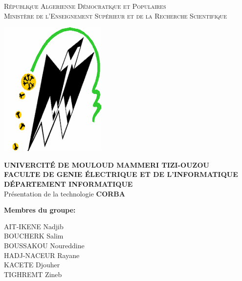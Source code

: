 \begin{center}
    \textsc{\large{République Algerienne Démocratique et Populaires}}\\ \medskip
    \textsc{\large{Ministère de l'Enseignement Supérieur et de la Recherche Scientifique}}\\
\end{center}

\begin{center}
    \includegraphics[scale=0.5]{pdg/ummto.png}\vspace*{0.5cm}
\end{center}

\begin{center}
    \textbf{\small{UNIVERCITÉ DE MOULOUD MAMMERI TIZI-OUZOU}}\\ \smallskip
    \textbf{\small{FACULTE DE GENIE ÉLECTRIQUE ET DE L’INFORMATIQUE}}\\ \smallskip
    \textbf{\small{DÉPARTEMENT INFORMATIQUE}}\\ \vspace*{1cm}
    \LARGE{Présentation de la technologie \textbf{CORBA}}\\
    
\end{center} \vspace*{1cm}

\begin{flushleft}
    \textbf{\large{Membres du groupe}:} \vspace{0.2cm}

        \hspace{0.5cm}AIT-IKENE Nadjib\\
        \hspace{0.5cm}BOUCHERK Salim\\
        \hspace{0.5cm}BOUSSAKOU Noureddine \\
        \hspace{0.5cm}HADJ-NACEUR Rayane \\
        \hspace{0.5cm}KACETE Djouher\\
        \hspace{0.5cm}TIGHREMT Zineb\\

\vspace*{3cm}

\end{flushleft}

